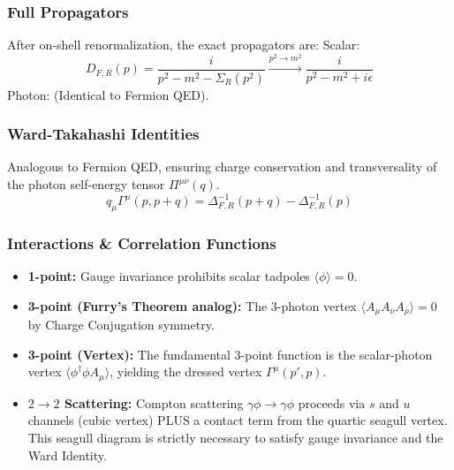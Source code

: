 \documentclass{article}
\begin{document}
\subsubsection*{Full Propagators}
After on-shell renormalization, the exact propagators are:
Scalar:
\begin{equation}
    D_{F,R}(p) = \frac{i}{p^2 - m^2 - \Sigma_R(p^2)} \xrightarrow{p^2 \to m^2} \frac{i}{p^2 - m^2 + i\epsilon}
\end{equation}
Photon: (Identical to Fermion QED).
\subsubsection*{Ward-Takahashi Identities}
Analogous to Fermion QED, ensuring charge conservation and transversality of the photon self-energy tensor $\Pi^{\mu\nu}(q)$.
\begin{equation}
    q_\mu \Gamma^\mu(p, p+q) = \Delta_{F,R}^{-1}(p+q) - \Delta_{F,R}^{-1}(p)
\end{equation}
\subsubsection*{Interactions \& Correlation Functions}
\begin{itemize}
    \item \textbf{1-point:} Gauge invariance prohibits scalar tadpoles $\langle \phi \rangle = 0$.
    \item \textbf{3-point (Furry's Theorem analog):} The 3-photon vertex $\langle A_\mu A_\nu A_\rho \rangle = 0$ by Charge Conjugation symmetry. 
    \item \textbf{3-point (Vertex):} The fundamental 3-point function is the scalar-photon vertex $\langle \phi^\dagger \phi A_\mu \rangle$, yielding the dressed vertex $\Gamma^\mu(p',p)$.
    \item \textbf{$2 \to 2$ Scattering:} Compton scattering $\gamma \phi \to \gamma \phi$ proceeds via $s$ and $u$ channels (cubic vertex) PLUS a contact term from the quartic seagull vertex. This seagull diagram is strictly necessary to satisfy gauge invariance and the Ward Identity.
\end{itemize}
\end{document}
